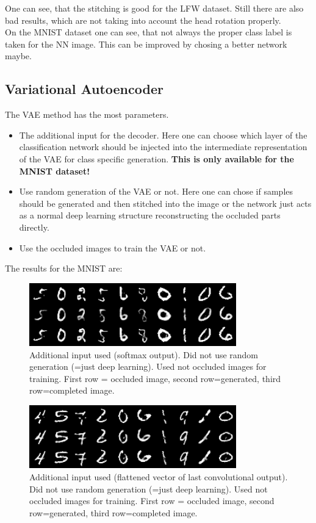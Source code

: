 \documentclass[
     11pt,         %
     a4paper,      %
     oneside,
     ]{article}
\begin{document}
One can see, that the stitching is good for the LFW dataset. Still there are also bad results, which are not taking into account the head rotation properly.\\
On the MNIST dataset one can see, that not always the proper class label is taken for the NN image. This can be improved by chosing a better network maybe.

\subsection{Variational Autoencoder}
The VAE method has the most parameters.
\begin{itemize}
  \item The additional input for the decoder. Here one can choose which layer of the classification network should be injected into the intermediate representation of the VAE for class specific generation. \textbf{This is only available for the MNIST dataset!}
  \item Use random generation of the VAE or not. Here one can chose if samples should be generated and then stitched into the image or the network just acts as a normal deep learning structure reconstructing the occluded parts directly.
  \item Use the occluded images to train the VAE or not.
\end{itemize}
The results for the MNIST are:
\begin{figure}[H]
  \begin{center}
    \includegraphics[width=0.8\textwidth]{presentation_results/VAE/MNIST-VAE-useRandom_false-useMNIST_true-VAERepresentation_3-useOccludedForTrain_false.png}
    \caption{Additional input used (softmax output). Did not use random generation (=just deep learning). Used not occluded images for training. First row = occluded image, second row=generated, third row=completed image.}
  \end{center}
\end{figure}
\begin{figure}[H]
  \begin{center}
    \includegraphics[width=0.8\textwidth]{presentation_results/VAE/MNIST-VAE-useRandom_true-useMNIST_true-VAERepresentation_1-useOccludedForTrain_false.png}
    \caption{Additional input used (flattened vector of last convolutional output). Did not use random generation (=just deep learning). Used not occluded images for training. First row = occluded image, second row=generated, third row=completed image.}
  \end{center}
\end{figure}
\end{document}
